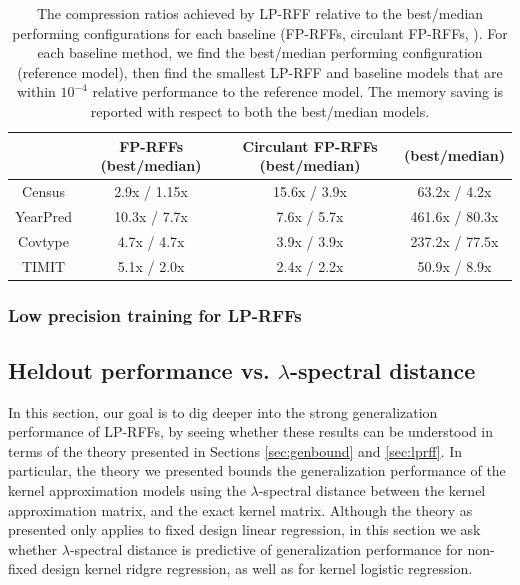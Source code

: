 \begin{table}
	\centering
	\begin{tabular}{c c c c}
		\hline
		& FP-RFFs (best/median) & Circulant FP-RFFs (best/median) & \Nystrom (best/median) \\
		\hline
		\hline
		Census & 2.9x / 1.15x & 15.6x / 3.9x & 63.2x / 4.2x \\
		YearPred & 10.3x / 7.7x & 7.6x / 5.7x & 461.6x / 80.3x \\ 
		Covtype & 4.7x / 4.7x & 3.9x / 3.9x & 237.2x / 77.5x \\ 
		TIMIT & 5.1x / 2.0x & 2.4x / 2.2x & 50.9x / 8.9x \\ 
		\hline
	\end{tabular}
	\caption{The compression ratios achieved by LP-RFF relative to the best/median performing configurations for each baseline (FP-RFFs, circulant FP-RFFs, \NystromNS). For each baseline method, we find the best/median performing configuration (reference model), then find the smallest LP-RFF and baseline models that are within $10^{-4}$ relative performance to the reference model. The memory saving is reported with respect to both the best/median models.}
	\label{fig:mem_saving}
\end{table}

\subsubsection{Low precision training for LP-RFFs}
\label{sec:lptrain}


\subsection{Heldout performance vs. $\lambda$-spectral distance}
In this section, our goal is to dig deeper into the strong generalization performance of LP-RFFs, by seeing whether these results can be understood in terms of the theory presented in Sections \ref{sec:genbound} and \ref{sec:lprff}.  In particular, the theory we presented bounds the generalization performance of the kernel approximation models using the $\lambda$-spectral distance between the kernel approximation matrix, and the exact kernel matrix.  Although the theory as presented only applies to fixed design linear regression, in this section we ask whether $\lambda$-spectral distance is predictive of generalization performance for non-fixed design kernel ridgre regression, as well as for kernel logistic regression.

